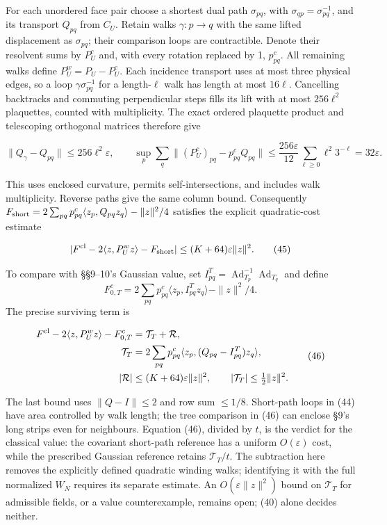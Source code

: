 \documentclass[11pt,a4paper]{article}
\begin{document}
For each unordered face pair choose a shortest dual path
\(\sigma_{pq}\), with \(\sigma_{qp}=\sigma_{pq}^{-1}\), and its
transport \(Q_{pq}\) from \(C_U\). Retain walks \(\gamma:p\to q\) with
the same lifted displacement as \(\sigma_{pq}\); their comparison loops
are contractible. Denote their resolvent sums by \(P_U^c\) and, with
every rotation replaced by 1, \(p^c_{pq}\). All remaining walks define
\(P_U^w=P_U-P_U^c\). Each incidence transport uses at most three
physical edges, so a loop \(\gamma\sigma_{pq}^{-1}\) for a
length-\(\ell\) walk has length at most \(16\ell\). Cancelling
backtracks and commuting perpendicular steps fills its lift with at most
\(256\ell^2\) plaquettes, counted with multiplicity. The exact ordered
plaquette product and telescoping orthogonal matrices therefore give

\[\|Q_\gamma-Q_{pq}\|\le256\ell^2\varepsilon,\qquad
\sup_p\sum_q\|(P_U^c)_{pq}-p^c_{pq}Q_{pq}\|
\le\frac{256\varepsilon}{12}\sum_{\ell\ge0}\ell^2 3^{-\ell}
=32\varepsilon.\tag{44}\]

This uses enclosed curvature, permits self-intersections, and includes
walk multiplicity. Reverse paths give the same column bound.
Consequently
\(F_{\rm short}=2\sum_{pq}p^c_{pq}\langle z_p,Q_{pq}z_q\rangle-\|z\|^2/4\)
satisfies the explicit quadratic-cost estimate

\[|F^{\rm cl}-2\langle z,P_U^wz\rangle-F_{\rm short}|
\le(K+64)\varepsilon\|z\|^2.\tag{45}\]

To compare with §§9--10's Gaussian value, set
\(I^T_{pq}=\operatorname{Ad}_{T_p}^{-1}\operatorname{Ad}_{T_q}\) and
define
\[F_{0,T}^c=2\sum_{pq}p^c_{pq}\langle z_p,I^T_{pq}z_q\rangle-\|z\|^2/4.\]
The precise surviving term is

\[\begin{aligned}
F^{\rm cl}-2\langle z,P_U^wz\rangle-F_{0,T}^c
 &=\mathcal T_T+\mathcal R,\\
\mathcal T_T&=2\sum_{pq}p^c_{pq}
 \langle z_p,(Q_{pq}-I^T_{pq})z_q\rangle,\\
|\mathcal R|&\le(K+64)\varepsilon\|z\|^2,\qquad
|\mathcal T_T|\le\tfrac12\|z\|^2.
\end{aligned}\tag{46}\]

The last bound uses \(\|Q-I\|\le2\) and row sum \(\le1/8\). Short-path
loops in (44) have area controlled by walk length; the tree comparison
in (46) can enclose §9's long strips even for neighbours. Equation (46),
divided by \(t\), is the verdict for the classical value: the covariant
short-path reference has a uniform \(O(\varepsilon)\) cost, while the
prescribed Gaussian reference retains \(\mathcal T_T/t\). The
subtraction here removes the explicitly defined quadratic winding walks;
identifying it with the full normalized \(W_N\) requires its separate
estimate. An \(O(\varepsilon\|z\|^2)\) bound on \(\mathcal T_T\) for
admissible fields, or a value counterexample, remains open; (40) alone
decides neither.
\end{document}
